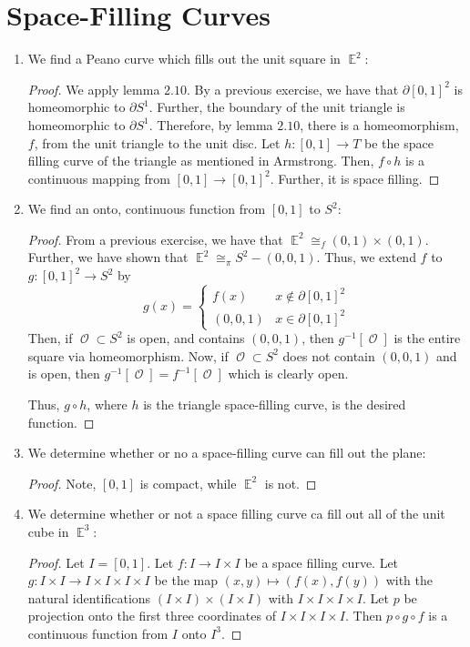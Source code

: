 \documentclass{book}
\DeclareMathOperator*{\E}{\mathbb{E}}
\DeclareMathOperator*{\Ocal}{\mathcal{O}}
\begin{document}
\section{Space-Filling Curves}
\begin{enumerate}[(1)]
    \item We find a Peano curve which fills out the unit square in $\E^2$: 
        \begin{proof} We apply lemma $2.10$. By a previous exercise, we have that $\partial [0,1]^2$ is homeomorphic to $\partial S^1$. Further, the boundary of the unit triangle is homeomorphic to $\partial S^1$. Therefore, by lemma $2.10$, there is a homeomorphism, $f$, from the unit triangle to the unit disc. Let $h: [0,1] \rightarrow T$ be the space filling curve of the triangle as mentioned in Armstrong. Then, $f \circ h$ is a continuous mapping from $[0,1] \rightarrow [0,1]^2$. Further, it is space filling. 
        \end{proof}

    \item We find an onto, continuous function from $[0,1]$ to $S^2$: 
        \begin{proof} From a previous exercise, we have that $\E^2 \cong_f (0,1) \times (0,1)$. Further, we have shown that $\E^2 \cong_\pi S^2 - (0,0,1)$. Thus, we extend $f$ to $g: [0,1]^2 \rightarrow S^2$ by 
            \[g(x) = 
            \begin{cases}
                f(x) & x \notin \partial [0,1]^2 \\
                (0,0,1) & x \in \partial [0,1]^2
            \end{cases}
            \]
            Then, if ${\Ocal} \subset S^2$ is open, and contains $(0,0,1)$, then $g^{-1}[{\Ocal}]$ is the entire square via homeomorphism. Now, if ${\Ocal} \subset S^2$ does not contain $(0,0,1)$ and is open, then $g^{-1}[{\Ocal}] = f^{-1}[{\Ocal}]$ which is clearly open. 
            \par
            Thus, $g \circ h$, where $h$ is the triangle space-filling curve, is the desired function.
        \end{proof}

    \item We determine whether or no a space-filling curve can fill out the plane: 
        \begin{proof} Note, $[0,1]$ is compact, while $\E^2$ is not. 
        \end{proof}

    \item We determine whether or not a space filling curve ca fill out all of the unit cube in $\E^3$: 
        \begin{proof} Let $I=[0,1]$.  Let $f:I\rightarrow I\times I$ be a space filling curve.  Let $g:I\times I\rightarrow I\times I\times I\times I$ be the map $(x,y)\mapsto (f(x),f(y))$ with the natural identifications $(I\times I)\times(I\times I)$ with $I\times I\times I\times I$. Let $p$ be projection onto the first three coordinates of $I\times I\times I\times I$.  Then $p\circ g\circ f$ is a continuous function from $I$ onto $I^3$.
        \end{proof}


\end{enumerate}
\end{document}
